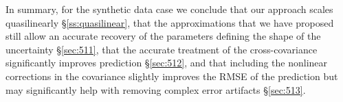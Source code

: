 \documentclass[article,ij4uq]{ij4uq}              %
\begin{document}
In summary, for the synthetic data case 
we conclude that our approach scales quasilinearly \S \ref{ss:quasilinear}, that the approximations that we have proposed  still allow an accurate recovery of the parameters defining the shape of the uncertainty \S \ref{sec:511}, that the accurate treatment of the cross-covariance significantly improves prediction \S \ref{sec:512}, and that  including the nonlinear corrections in the covariance slightly improves the RMSE of the prediction but may significantly help with removing complex error artifacts \S \ref{sec:513}.

\begin{figure}[!t]
\centering
{}
\end{figure}
\end{document}
